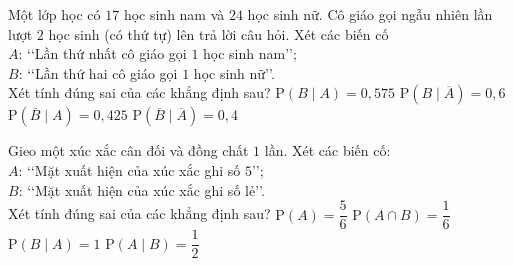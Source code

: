 \begin{ex}%
	Một lớp học có $17$ học sinh nam và $24$ học sinh nữ. Cô giáo gọi ngẫu nhiên lần lượt $2$ học sinh (có thứ tự) lên trả lời câu hỏi. Xét các biến cố\\
	$A$: \lq\lq  Lần thứ nhất cô giáo gọi $1$ học sinh nam\rq\rq;\\
	$B$: \lq\lq  Lần thứ hai cô giáo gọi $1$ học sinh nữ\rq\rq.\\
	Xét tính đúng sai của các khẳng định sau?
	\choiceTF
	{$\mathrm{P}(B \mid A)=0{,}575$}
	{$\mathrm{P}(B \mid \overline{A})=0{,}6$}
	{$\mathrm{P}(\overline{B} \mid A)=0{,}425$}
	{$\mathrm{P}(\overline{B} \mid \overline{A})=0{,}4$}
\end{ex}
\begin{ex}%
	Gieo một xúc xắc cân đối và đồng chất $1$ lần. Xét các biến cố:\\
	$A$: \lq\lq  Mặt xuất hiện của xúc xắc ghi số $5$\rq\rq;\\
	$B$: \lq\lq  Mặt xuất hiện của xúc xắc ghi số lẻ\rq\rq.\\
	Xét tính đúng sai của các khẳng định sau?
	\choiceTF
	{$\mathrm{P}(A)=\dfrac{5}{6}$}
	{\True $\mathrm{P}(A \cap B)=\dfrac{1}{6}$}
	{\True $\mathrm{P}(B \mid A)=1$}
	{$\mathrm{P}(A \mid B)=\dfrac{1}{2}$}
\end{ex}
